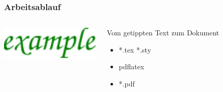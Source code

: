 \begin{frame}
    \frametitle{Arbeitsablauf}
    \begin{columns}
        \begin{column}{0.50\textwidth}
            \centering
            \includegraphics[width=1.00\textwidth]{../fig/example.pdf}
        \end{column}
        \begin{column}{0.50\textwidth}
            \begin{block}{Vom getippten Text zum Dokument}
                \begin{itemize}
                    \pause
                    \item *.tex *.sty
                    \pause
                    \item pdflatex
                    \pause
                    \item *.pdf
                \end{itemize}
            \end{block}
        \end{column}
    \end{columns}
\end{frame}
